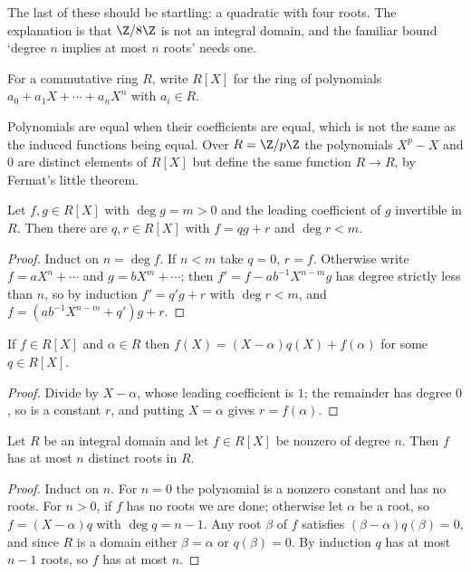 The last of these should be startling: a quadratic with four roots. The explanation is that $\Z/8\Z$ is not an integral domain, and the familiar bound `degree $n$ implies at most $n$ roots' needs one.

\begin{definition}
	For a commutative ring $R$, write $R[X]$ for the ring of polynomials $a_0 + a_1 X + \cdots + a_n X^n$ with $a_i \in R$.
\end{definition}

\begin{remark}
	Polynomials are equal when their coefficients are equal, which is not the same as the induced functions being equal. Over $R = \Z/p\Z$ the polynomials $X^p - X$ and $0$ are distinct elements of $R[X]$ but define the same function $R \to R$, by Fermat's little theorem.
\end{remark}

\begin{proposition}
	Let $f, g \in R[X]$ with $\deg g = m > 0$ and the leading coefficient of $g$ invertible in $R$. Then there are $q, r \in R[X]$ with $f = qg + r$ and $\deg r < m$.
\end{proposition}
\begin{proof}
	Induct on $n = \deg f$. If $n < m$ take $q = 0$, $r = f$. Otherwise write $f = aX^n + \cdots$ and $g = bX^m + \cdots$; then $f' = f - ab^{-1}X^{n - m}g$ has degree strictly less than $n$, so by induction $f' = q'g + r$ with $\deg r < m$, and $f = (ab^{-1}X^{n-m} + q')g + r$.
\end{proof}

\begin{corollary}
	If $f \in R[X]$ and $\alpha \in R$ then $f(X) = (X - \alpha)q(X) + f(\alpha)$ for some $q \in R[X]$.
\end{corollary}
\begin{proof}
	Divide by $X - \alpha$, whose leading coefficient is $1$; the remainder has degree $0$, so is a constant $r$, and putting $X = \alpha$ gives $r = f(\alpha)$.
\end{proof}

\begin{theorem}\label{thm:roots}
	Let $R$ be an integral domain and let $f \in R[X]$ be nonzero of degree $n$. Then $f$ has at most $n$ distinct roots in $R$.
\end{theorem}
\begin{proof}
	Induct on $n$. For $n = 0$ the polynomial is a nonzero constant and has no roots. For $n > 0$, if $f$ has no roots we are done; otherwise let $\alpha$ be a root, so $f = (X - \alpha)q$ with $\deg q = n - 1$. Any root $\beta$ of $f$ satisfies $(\beta - \alpha)q(\beta) = 0$, and since $R$ is a domain either $\beta = \alpha$ or $q(\beta) = 0$. By induction $q$ has at most $n - 1$ roots, so $f$ has at most $n$.
\end{proof}

